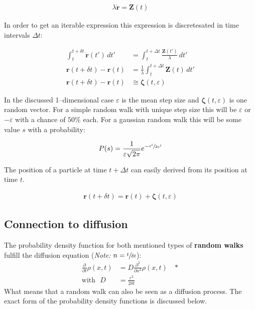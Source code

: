 \documentclass[a4paper, parskip=half]{scrartcl}
\newcommand{\effect}[1]{%
	\textbf{#1}%
}
\newcommand{\myEqLabel}[1]{\label{eq:#1}}
\newcommand{\myEqAnnex}[1]{\;\;\;\ast \myEqLabel{#1}}
\begin{document}
\begin{align}
\lambda\dot{\mathbf{r}} = \mathbf{Z}(t)
\end{align}

In order to get an iterable expression this expression is discretesated in time intervals $\Delta t$:

\begin{align}
\int_t^{t+ \delta t} \dot{\mathbf{r}}(t')\, dt' &= \int_t^{t+ \Delta t} \frac{\mathbf{Z}(t')}{\lambda}\, dt' \\
\mathbf{r}(t + \delta t) - \mathbf{r}(t) &= \frac{1}{\lambda} \int_t^{t+ \Delta t} \mathbf{Z}(t)\, dt'\\
\mathbf{r}(t + \delta t) - \mathbf{r}(t) &\cong \boldsymbol{\zeta}(t, \varepsilon)
\end{align}

In the discussed 1--dimensional case $\varepsilon$ is the mean step size and $\boldsymbol{\zeta}(t, \varepsilon)$ is one random vector. For a simple random walk with unique step size this will be $\varepsilon$ or $-\varepsilon$ with a chance of $50\%$ each. For a gaussian random walk this will be some value $s$ with a probability:

\begin{align}
P(s) = \frac{1}{\varepsilon \sqrt{2\pi}} e^{-\sfrac{s^2}{2\varepsilon^2}}
\end{align} 

The position of a particle at time $t + \Delta t$ can easily derived from its position at time $t$.

\begin{align}
\mathbf{r}(t + \delta t) = \mathbf{r}(t) + \boldsymbol{\zeta}(t, \varepsilon)
\end{align}

\subsection{Connection to diffusion}
The probability density function for both mentioned types of \effect{random walks} fulfill the diffusion equation (\textit{Note: }$n = \sfrac{t}{\delta t}$):
\begin{align}
\frac{\partial}{\partial t} \rho(x,t) &= D \frac{\partial^2}{\partial x^2 } \rho(x,t) \myEqAnnex{diffusion_PDE} \\
\mathrm{with} \, \, \,\, D &= \frac{\varepsilon^2}{2 \delta t} \myEqLabel{def:D}
\end{align}
What means that a random walk can also be seen as a diffusion process. The exact form of the probability density functions is discussed below.
\end{document}
